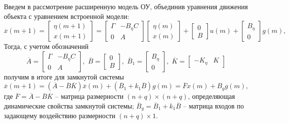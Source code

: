 Введем в рассмотрение расширенную модель ОУ, объединив уравнения движения объекта с уравнением встроенной модели:
\begin{equation}
	\overline{x}(m+1) = \begin{bmatrix}
		\eta (m+1)\\
		x(m + 1)
	\end{bmatrix} = \begin{bmatrix}
	\Gamma & -B_\eta C\\
	0 & A
	\end{bmatrix} \begin{bmatrix}
	\eta (m)\\ x(m)
	\end{bmatrix} + \begin{bmatrix}
	0 \\ B
	\end{bmatrix} u(m) + \begin{bmatrix}
	B_\eta \\ 0
	\end{bmatrix} g(m),
\end{equation}
Тогда, с учетом обозначений
\begin{equation}
	\overline{A} = \begin{bmatrix}
		\Gamma & -B_\eta C\\
		0 & A
	\end{bmatrix}, \, \,
	\overline{B} = \begin{bmatrix}
		0\\B
	\end{bmatrix}, \, \, 
	\overline{B}_1 = \begin{bmatrix}
		B_\eta \\ 0
	\end{bmatrix}, \, \, 
	\overline{K} = \begin{bmatrix}
		-K_\eta & K
	\end{bmatrix}
\end{equation}
получим в итоге для замкнутой системы
\begin{equation}
	\overline{x} (m+1) = \left(\overline{A} - \overline{B}\overline{K}\right)\overline{x}(m) + \left(\overline{B}_1 + k_1 \overline{B}\right) g(m) = \overline{F}x(m) + B_g g(m),
\end{equation}
где $\overline{F} = \overline{A} - \overline{B} \overline{K}$ -- матрица размерности $(n + q) \times (n + q)$, определяющая динамические свойства замкнутой системы; $\overline{B}_g = \overline{B}_1 + k_1 \overline{B}$ -- матрица входов по задающему воздействию размерности $(n+q) \times 1$.

